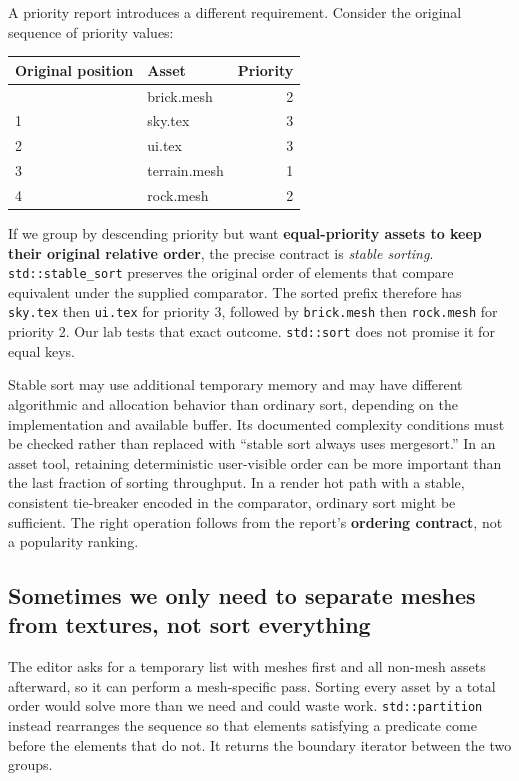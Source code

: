 A priority report introduces a different requirement. Consider the original sequence of priority values:

{\def\LTcaptype{none} %
\begin{longtable}[]{@{}llr@{}}
\toprule\noalign{}
Original position & Asset & Priority \\
\midrule\noalign{}
\endhead
\bottomrule\noalign{}
\endlastfoot
0 & brick.mesh & 2 \\
1 & sky.tex & 3 \\
2 & ui.tex & 3 \\
3 & terrain.mesh & 1 \\
4 & rock.mesh & 2 \\
\end{longtable}
}

If we group by descending priority but want \textbf{equal-priority assets to keep their original relative order}, the precise contract is \emph{stable sorting}. \texttt{std::stable\_sort} preserves the original order of elements that compare equivalent under the supplied comparator. The sorted prefix therefore has \texttt{sky.tex} then \texttt{ui.tex} for priority 3, followed by \texttt{brick.mesh} then \texttt{rock.mesh} for priority 2. Our lab tests that exact outcome. \texttt{std::sort} does not promise it for equal keys.

Stable sort may use additional temporary memory and may have different algorithmic and allocation behavior than ordinary sort, depending on the implementation and available buffer. Its documented complexity conditions must be checked rather than replaced with ``stable sort always uses mergesort.'' In an asset tool, retaining deterministic user-visible order can be more important than the last fraction of sorting throughput. In a render hot path with a stable, consistent tie-breaker encoded in the comparator, ordinary sort might be sufficient. The right operation follows from the report's \textbf{ordering contract}, not a popularity ranking.

\subsection{Sometimes we only need to separate meshes from textures, not sort everything}\label{01-foundations-i-ch006-sometimes-we-only-need-to-separate-meshes-from-textures-not-sort-everything}

The editor asks for a temporary list with meshes first and all non-mesh assets afterward, so it can perform a mesh-specific pass. Sorting every asset by a total order would solve more than we need and could waste work. \texttt{std::partition} instead rearranges the sequence so that elements satisfying a predicate come before the elements that do not. It returns the boundary iterator between the two groups.

